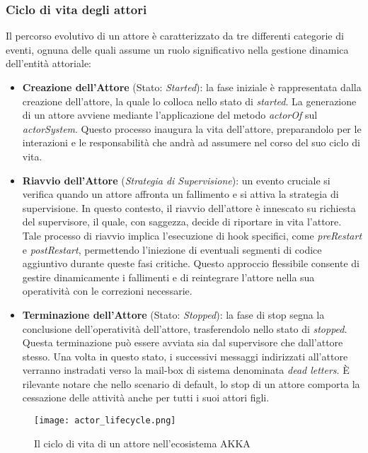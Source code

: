 \subsubsection[Ciclo di vita]{Ciclo di vita degli attori}
Il percorso evolutivo di un attore è caratterizzato da tre differenti categorie di eventi, ognuna delle quali assume un ruolo significativo nella gestione dinamica dell'entità attoriale:
\begin{itemize}
  \item \textbf{Creazione dell'Attore} (Stato: \textit{Started}): la fase iniziale è rappresentata dalla creazione dell'attore, la quale lo colloca nello stato di \textit{started}.
  La generazione di un attore avviene mediante l'applicazione del metodo \textit{actorOf} sul \textit{actorSystem}.
  Questo processo inaugura la vita dell'attore, preparandolo per le interazioni e le responsabilità che andrà ad assumere nel corso del suo ciclo di vita.
  \item \textbf{Riavvio dell'Attore} (\textit{Strategia di Supervisione}): un evento cruciale si verifica quando un attore affronta un fallimento e si attiva la strategia di supervisione.
  In questo contesto, il riavvio dell'attore è innescato su richiesta del supervisore, il quale, con saggezza, decide di riportare in vita l'attore.
  Tale processo di riavvio implica l'esecuzione di hook specifici, come \textit{preRestart} e \textit{postRestart}, permettendo l'iniezione di eventuali segmenti di codice aggiuntivo durante queste fasi critiche.
  Questo approccio flessibile consente di gestire dinamicamente i fallimenti e di reintegrare l'attore nella sua operatività con le correzioni necessarie.
  \item \textbf{Terminazione dell'Attore} (Stato: \textit{Stopped}): la fase di stop segna la conclusione dell'operatività dell'attore, trasferendolo nello stato di \textit{stopped}.
  Questa terminazione può essere avviata sia dal supervisore che dall'attore stesso.
  Una volta in questo stato, i successivi messaggi indirizzati all'attore verranno instradati verso la mail-box di sistema denominata \textit{dead letters}.
  È rilevante notare che nello scenario di default, lo stop di un attore comporta la cessazione delle attività anche per tutti i suoi attori figli.
\end{itemize}

\begin{figure}[!ht]
  \centering
  \texttt{[image: actor\_lifecycle.png]}
  \caption[Ciclo di vita]{Il ciclo di vita di un attore nell'ecosistema AKKA}
\end{figure}

